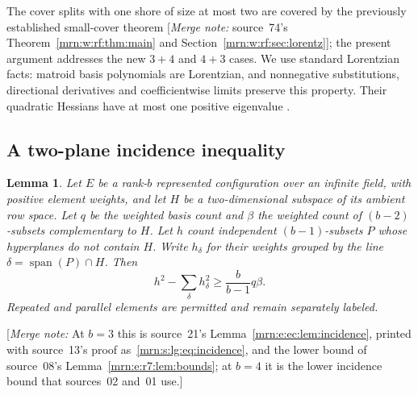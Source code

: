 \documentclass[11pt,a4paper]{article}
\newtheorem{lemma}[theorem]{Lemma}
\theoremstyle{remark}\newtheorem{remark}[theorem]{Remark}
\newcommand{\spn}{\operatorname{span}}     %
\newcommand{\mnote}[1]{[\textit{Merge note:} #1]}
\begin{document}
The cover splits with one shore of size at most two are covered by the previously established small-cover theorem \cite[Theorem 1.1 and Section 2]{b:m74} \mnote{source~74's Theorem~\ref{mrn:w:rf:thm:main} and Section~\ref{mrn:w:rf:sec:lorentz}}; the present argument addresses the new $3+4$ and $4+3$ cases. We use standard Lorentzian facts: matroid basis polynomials are Lorentzian, and nonnegative substitutions, directional derivatives and coefficientwise limits preserve this property. Their quadratic Hessians have at most one positive eigenvalue \cite{b:BH}.

\subsection{A two-plane incidence inequality}
\begin{lemma}\label{mrn:e:tg:lem:plane}
Let $E$ be a rank-$b$ represented configuration over an infinite field, with positive element weights, and let $H$ be a two-dimensional subspace of its ambient row space. Let $q$ be the weighted basis count and $\beta$ the weighted count of $(b-2)$-subsets complementary to $H$. Let $h$ count independent $(b-1)$-subsets $P$ whose hyperplanes do not contain $H$. Write $h_\delta$ for their weights grouped by the line $\delta=\spn(P)\cap H$. Then
\begin{equation}\label{mrn:e:tg:eq:plane}
 h^2-\sum_\delta h_\delta^2\ge\frac{b}{b-1}q\beta.
\end{equation}
Repeated and parallel elements are permitted and remain separately labeled.
\end{lemma}
\mnote{At $b=3$ this is source~21's Lemma~\ref{mrn:e:ec:lem:incidence}, printed with source~13's proof as~\eqref{mrn:s:lg:eq:incidence}, and the lower bound of source~08's Lemma~\ref{mrn:e:r7:lem:bounds}; at $b=4$ it is the lower incidence bound that sources~02 and~01 use.}
\end{document}
